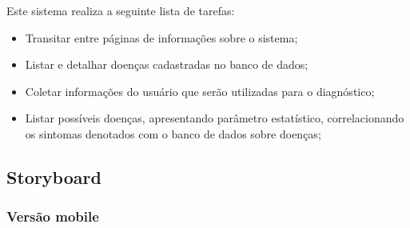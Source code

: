 Este sistema realiza a seguinte lista de tarefas:
\begin{itemize}
	\item Transitar entre páginas de informações sobre o sistema;
	\item Listar e detalhar doenças cadastradas no banco de dados;
	\item Coletar informações do usuário que serão utilizadas para o diagnóstico;
	\item Listar possíveis doenças, apresentando parâmetro estatístico, correlacionando os sintomas denotados com o banco de dados sobre doenças;
\end{itemize}

\subsection{Storyboard}

\subsubsection{Versão mobile}

